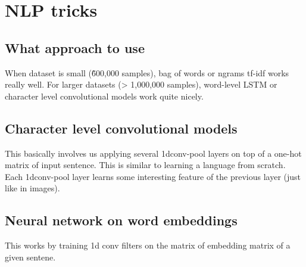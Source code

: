 \chapter{NLP tricks}

\section{What approach to use}

When dataset is small (\~ 600,000 samples), bag of words or ngrams tf-idf works really well. For larger datasets (> 1,000,000 samples), word-level LSTM or character level convolutional models work quite nicely.

\section{Character level convolutional models}

This basically involves us applying several 1dconv-pool layers on top of a one-hot matrix of input sentence. This is similar to learning a language from scratch. Each 1dconv-pool layer learns some interesting feature of the previous layer (just like in images).

\section{Neural network on word embeddings}

This works by training 1d conv filters on the matrix of embedding matrix of a given sentene.

